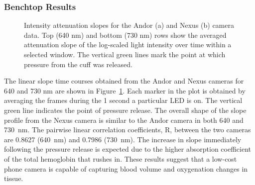 \subsubsection{Benchtop Results}
\begin{figure}
    \begin{center}
    \end{center}
    \caption{Intensity attenuation slopes for the Andor (a) and Nexus (b) camera data. Top (640 nm) and bottom (730 nm) rows show the averaged attenuation slope of the log-scaled light intensity over time within a selected window. The vertical green lines mark the point at which pressure from the cuff was released.} 
    \label{fig:D2results}
\end{figure} 
The linear slope time courses obtained from the Andor and Nexus cameras for 640 and 730 nm are shown in Figure~\ref{fig:D2results}. Each marker in the plot is obtained by averaging the frames during the 1 second a particular LED is on. The vertical green line indicates the point of pressure release. The overall shape of the slope profile from the Nexus camera is similar to the Andor camera in both 640 and 730~nm. The pairwise linear correlation coefficients, R, between the two cameras are 0.8627 (640~nm) and 0.7986 (730~nm). The increase in slope immediately following the pressure release is expected due to the higher absorption coefficient of the total hemoglobin that rushes in. These results suggest that a low-cost phone camera is capable of capturing blood volume and oxygenation changes in tissue. 



